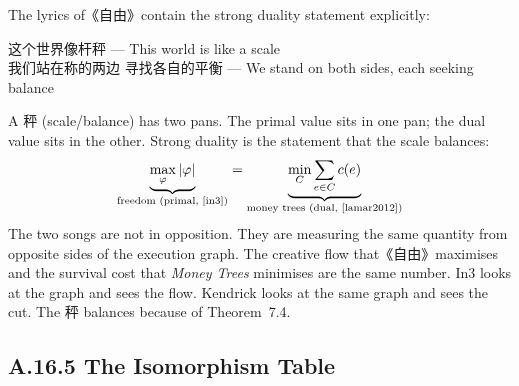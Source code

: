 \documentclass[11pt,a4paper]{article}
\theoremstyle{definition}
\theoremstyle{remark}
\begin{document}
The lyrics of《自由》contain the strong duality statement explicitly:

\begin{center}
{\color{red!70!black} 这个世界像杆秤} --- This world is like a scale\\
{\color{yellow!70!black} 我们站在称的两边} {\color{green!60!black} 寻找各自的平衡} --- We stand on both sides, each seeking balance
\end{center}

A 秤 (scale/balance) has two pans. The primal value sits in one pan; the dual value sits in the other. Strong duality is the statement that the scale balances:
\[
  \underbrace{\max_\varphi |\varphi|}_{\text{freedom (primal, \cite{in3})}} = \underbrace{\min_C \sum_{e \in C} c(e)}_{\text{money trees (dual, \cite{lamar2012})}}
\]
The two songs are not in opposition. They are measuring the same quantity from opposite sides of the execution graph. The creative flow that《自由》maximises and the survival cost that \emph{Money Trees} minimises are the same number. In3 looks at the graph and sees the flow. Kendrick looks at the same graph and sees the cut. The 秤 balances because of Theorem~7.4.


\subsection{A.16.5 The Isomorphism Table}
\end{document}

